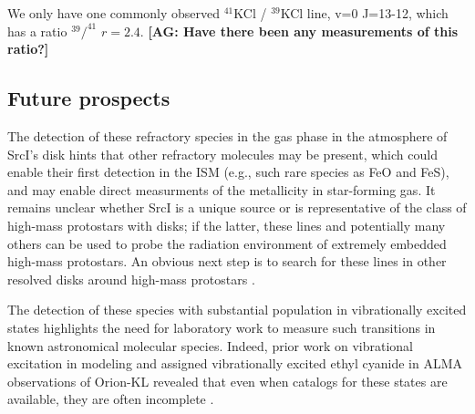 \documentclass[twocolumn]{aastex62}
\newcommand{\sourcei}{SrcI\xspace}
\newcommand{\ag}[1]{\textcolor{red!65!black}{\textbf{[AG: #1]}}}
\begin{document}
We only have one commonly observed $^{41}$KCl / $^{39}$KCl line, v=0 J=13-12,
which has a ratio $^{39}/^{41}$ $r=2.4$.  \ag{Have there been any measurements
of this ratio?}


\subsection{Future prospects}
The detection of these refractory species in the gas phase in the atmosphere
of \sourcei's disk hints that other refractory molecules may be present, 
which could enable their first detection in the ISM (e.g., such rare species as
FeO and FeS), and may enable direct measurments of the metallicity in
star-forming gas.
It remains unclear whether \sourcei is a unique source or is representative
of the class of high-mass protostars with disks; if the latter, these lines
and potentially many others can be used to probe the radiation environment of 
extremely embedded high-mass protostars.  An obvious next step is to search
for these lines in other resolved disks around high-mass protostars \citep[e.g.
HH80/81][]{Girart2017a}.

The detection of these species with substantial population in vibrationally
excited states highlights the need for laboratory work to measure such
transitions in known astronomical molecular species. Indeed, prior work on
vibrational excitation in modeling and assigned vibrationally excited ethyl
cyanide in ALMA observations of Orion-KL revealed that even when catalogs for
these states are available, they are often incomplete \citep{Fortman2012a}.
\end{document}
